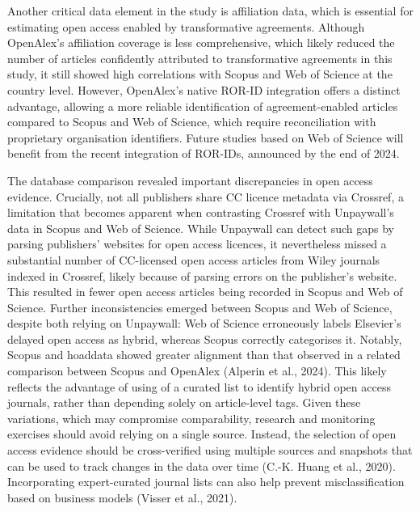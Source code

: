 \documentclass[a4paper,man,floatsintext,longtable,noextraspace,10pt]{apa6}
\begin{document}
Another critical data element in the study is affiliation data, which is
essential for estimating open access enabled by transformative
agreements. Although OpenAlex's affiliation coverage is less
comprehensive, which likely reduced the number of articles confidently
attributed to transformative agreements in this study, it still showed
high correlations with Scopus and Web of Science at the country level.
However, OpenAlex's native ROR-ID integration offers a distinct
advantage, allowing a more reliable identification of agreement-enabled
articles compared to Scopus and Web of Science, which require
reconciliation with proprietary organisation identifiers. Future studies
based on Web of Science will benefit from the recent integration of
ROR-IDs, announced by the end of 2024.

The database comparison revealed important discrepancies in open access
evidence. Crucially, not all publishers share CC licence metadata via
Crossref, a limitation that becomes apparent when contrasting Crossref
with Unpaywall's data in Scopus and Web of Science. While Unpaywall can
detect such gaps by parsing publishers' websites for open access
licences, it nevertheless missed a substantial number of CC-licensed
open access articles from Wiley journals indexed in Crossref, likely
because of parsing errors on the publisher's website. This resulted in
fewer open access articles being recorded in Scopus and Web of Science.
Further inconsistencies emerged between Scopus and Web of Science,
despite both relying on Unpaywall: Web of Science erroneously labels
Elsevier's delayed open access as hybrid, whereas Scopus correctly
categorises it. Notably, Scopus and hoaddata showed greater alignment
than that observed in a related comparison between Scopus and OpenAlex
(Alperin et al., 2024). This likely reflects the advantage of using of a
curated list to identify hybrid open access journals, rather than
depending solely on article-level tags. Given these variations, which
may compromise comparability, research and monitoring exercises should
avoid relying on a single source. Instead, the selection of open access
evidence should be cross-verified using multiple sources and snapshots
that can be used to track changes in the data over time (C.-K. Huang et
al., 2020). Incorporating expert-curated journal lists can also help
prevent misclassification based on business models (Visser et al.,
2021).
\end{document}
